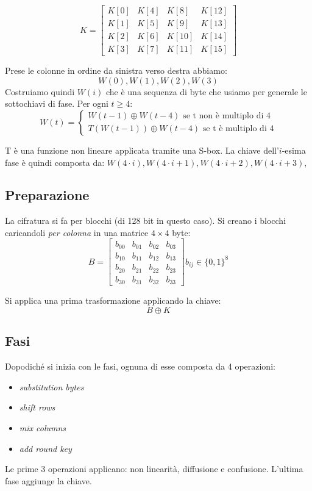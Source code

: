 $$
K = 
    \begin{bmatrix}
        K[0] & K[4] & K[8] & K[12] \\
        K[1] & K[5] & K[9] & K[13] \\
        K[2] & K[6] & K[10] & K[14] \\
        K[3] & K[7] & K[11] & K[15]
    \end{bmatrix}
$$

Prese le colonne in ordine da sinistra verso destra abbiamo: 
$$W(0), W(1), W(2), W(3)$$
Costruiamo quindi $W(i)$ che è una sequenza di byte che usiamo per generale le sottochiavi di fase.
Per ogni $t \geq 4$:
\begin{equation}
    W(t) = 
    \begin{cases}
        W(t-1) \oplus W(t-4) \text{ se t non è multiplo di 4} \\
        T(W(t-1)) \oplus W(t-4) \text{ se t è multiplo di 4}
    \end{cases}
\end{equation}

T è una funzione non lineare applicata tramite una S-box.
La chiave dell'$i$-esima fase è quindi composta da:
$W(4 \cdot i), W(4 \cdot i + 1), W(4 \cdot i + 2), W(4 \cdot i + 3),$

\subsection{Preparazione}
La cifratura si fa per blocchi (di 128 bit in questo caso).
Si creano i blocchi caricandoli \emph{per colonna} in una matrice $4 \times 4$ byte:
$$
B = 
    \begin{bmatrix}
        b_{00} & b_{01} & b_{02} & b_{03} \\
        b_{10} & b_{11} & b_{12} & b_{13} \\
        b_{20} & b_{21} & b_{22} & b_{23} \\
        b_{30} & b_{31} & b_{32} & b_{33}
    \end{bmatrix}
    b_{ij} \in \{0, 1\}^{8}
$$

Si applica una prima trasformazione applicando la chiave:
$$ B \oplus K $$

\subsection{Fasi}
Dopodiché si inizia con le fasi, ognuna di esse composta da 4 operazioni:
\begin{itemize}
    \item \emph{substitution bytes}
    \item \emph{shift rows}
    \item \emph{mix columns}
    \item \emph{add round key}
\end{itemize}
Le prime 3 operazioni applicano: non linearità, diffusione e confusione.
L'ultima fase aggiunge la chiave.

